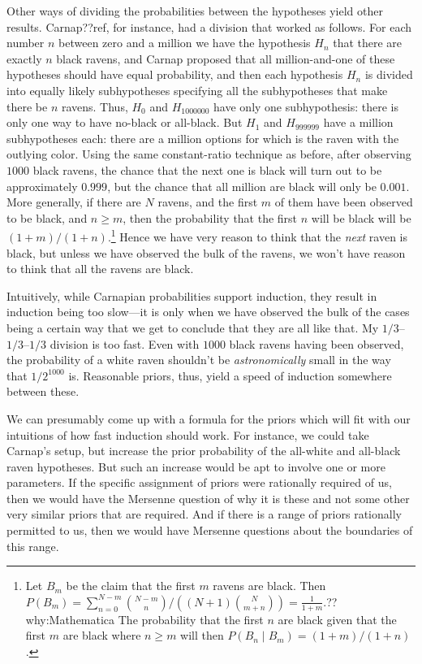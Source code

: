 Other ways of dividing the probabilities between the hypotheses yield other results. Carnap??ref, for instance, had a division
that worked as follows. For each number $n$ between zero and a million we have the hypothesis $H_n$ that there are exactly 
$n$ black ravens, and Carnap proposed that all million-and-one of these hypotheses should have equal probability, and then 
each hypothesis $H_n$ is divided into equally likely subhypotheses specifying all the subhypotheses that make there be $n$
ravens. Thus, $H_0$ and $H_{1000000}$ have only one subhypothesis: there is only one way to have no-black or all-black. But
$H_1$ and $H_{999999}$ have a million subhypotheses each: there are a million options for which is the raven with the outlying
color. Using the same constant-ratio technique as before, after observing $1000$ black ravens, the chance that the next one is black 
will turn out to be approximately $0.999$, but the chance that all million are black will only be $0.001$. More generally, if there
are $N$ ravens, and the first $m$ of them have been observed to be black, and $n\ge m$, then the probability that the first $n$
will be black will be $(1+m)/(1+n)$.\footnote{Let $B_m$ be the claim that the first $m$ ravens are black. Then
$P(B_m)=\sum_{n=0}^{N-m} {{N-m \choose n}}/((N+1){N\choose m+n}) = \frac{1}{1+m}$.??why:Mathematica The probability that the first
$n$ are black given that the first $m$ are black where $n\ge m$ will then $P(B_n\mid B_m)=(1+m)/(1+n)$.} 
  Hence we have very reason to think that the \textit{next} raven is black,
but unless we have observed the bulk of the ravens, we won't have reason to think that all the ravens are black. 

Intuitively, while Carnapian probabilities support induction, they result in induction being too slow---it is only when we have observed the bulk of the cases
being a certain way that we get to conclude that they are all like that. My $1/3$--$1/3$--$1/3$ division is too fast. Even with
$1000$ black ravens having been observed, the probability of a white raven shouldn't be \textit{astronomically} small in the way
that $1/2^{1000}$ is. Reasonable priors, thus, yield a speed of induction somewhere between these. 

We can presumably come up with a formula for the priors which will fit with our intuitions of how fast induction should work.
For instance, we could take Carnap's setup, but increase the prior probability of the all-white and all-black raven hypotheses. 
But such an increase would be apt to involve one or more parameters. If the specific assignment of priors were rationally
required of us, then we would have the Mersenne question of why it is these and not some other very similar priors that are required.
And if there is a range of priors rationally permitted to us, then we would have Mersenne questions about the boundaries of
this range. 

